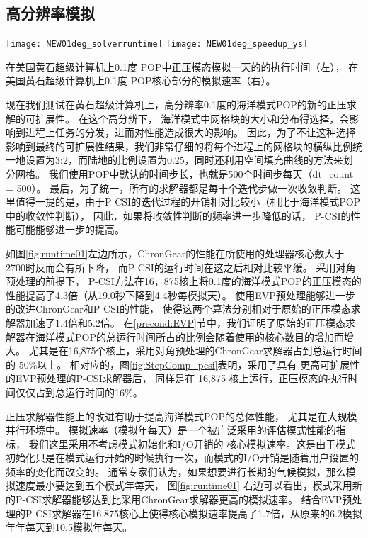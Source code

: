 \subsection{高分辨率模拟}
\label{precond:exp:high}

\begin {figure*}
\begin{center}
\texttt{[image: NEW01deg\_solverruntime]}
\hspace{10pt}
\texttt{[image: NEW01deg\_speedup\_ys]}
\end{center}
\caption []{ 在美国黄石超级计算机上0.1度 POP中正压模态模拟一天的的执行时间（左）， 
在美国黄石超级计算机上0.1度 POP核心部分的模拟速率（右）。\label {fig:runtime01}}
\end {figure*}


现在我们测试在黄石超级计算机上，高分辨率0.1度的海洋模式POP的新的正压求解的可扩展性。 
在这个高分辨下， 海洋模式中网格块的大小和分布得选择，会影响到进程上任务的分发，进而对性能造成很大的影响。 
因此，为了不让这种选择影响到最终的可扩展性结果，我们非常仔细的将每个进程上的网格块的横纵比例统一地设置为3:2，而陆地的比例设置为0.25，同时还利用空间填充曲线的方法来划分网格。 
我们使用POP中默认的时间步长，也就是500个时间步每天（dt\_count = 500）。 
最后，为了统一，所有的求解器都是每十个迭代步做一次收敛判断。 
这里值得一提的是，由于P-CSI的迭代过程的开销相对比较小（相比于海洋模式POP中的收敛性判断）， 因此，如果将收敛性判断的频率进一步降低的话， P-CSI的性能可能能够进一步的提高。 
 

如图\ref{fig:runtime01}左边所示，ChronGear的性能在所使用的处理器核心数大于2700时反而会有所下降，
而P-CSI的运行时间在这之后相对比较平缓。 
采用对角预处理的前提下， P-CSI方法在16，875核上将0.1度的海洋模式POP的正压模态的性能提高了4.3倍（从19.0秒下降到4.4秒每模拟天）。 
使用EVP预处理能够进一步的改进ChronGear和P-CSI的性能， 使得这两个算法分别相对于原始的正压模态求解器加速了1.4倍和5.2倍。
在\ref{precond:EVP}节中，我们证明了原始的正压模态求解器在海洋模式POP的总运行时间所占的比例会随着使用的核心数目的增加而增大。
尤其是在16,875个核上，采用对角预处理的ChronGear求解器占到总运行时间的 50\%以上。 
相对应的，图\ref{fig:StepComp_pcsi}表明，采用了具有 更高可扩展性的EVP预处理的P-CSI求解器后， 同样是在 16,875 核上运行，正压模态的执行时间仅仅占到总运行时间的16\%。 

 
正压求解器性能上的改进有助于提高海洋模式POP的总体性能， 尤其是在大规模并行环境中。
模拟速率（模拟年每天）是一个被广泛采用的评估模式性能的指标， 我们这里采用不考虑模式初始化和I/O开销的 核心模拟速率。这是由于模式初始化只是在模式运行开始的时候执行一次，而模式的I/O开销是随着用户设置的频率的变化而改变的。 
通常专家们认为，如果想要进行长期的气候模拟，那么模拟速度最小要达到五个模式年每天\cite{dennis2012computational}， 图\ref{fig:runtime01} 右边可以看出，模式采用新的P-CSI求解器能够达到比采用ChronGear求解器更高的模拟速率。 
结合EVP预处理的P-CSI求解器在16,875核心上使得核心模拟速率提高了1.7倍，从原来的6.2模拟年年每天到10.5模拟年每天。 
 

